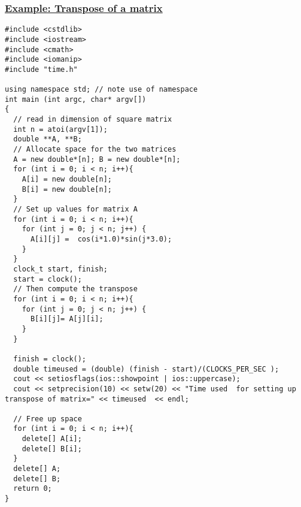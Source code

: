 \documentclass{beamer}
\begin{document}
\begin{frame}
\frametitle{\href{{https://github.com/CompPhysics/ComputationalPhysicsMSU/blob/master/doc/Programs/LecturePrograms/programs/Classes/cpp/program8.cpp}}{Example: Transpose of a matrix}}

\begin{Verbatim}[numbers=none,fontsize=\fontsize{9pt}{9pt},baselinestretch=0.95]
#include <cstdlib>
#include <iostream>
#include <cmath>
#include <iomanip>
#include "time.h"

using namespace std; // note use of namespace
int main (int argc, char* argv[])
{
  // read in dimension of square matrix
  int n = atoi(argv[1]);
  double **A, **B;
  // Allocate space for the two matrices
  A = new double*[n]; B = new double*[n];
  for (int i = 0; i < n; i++){
    A[i] = new double[n];
    B[i] = new double[n];
  }
  // Set up values for matrix A
  for (int i = 0; i < n; i++){
    for (int j = 0; j < n; j++) {
      A[i][j] =  cos(i*1.0)*sin(j*3.0);
    }
  }
  clock_t start, finish;
  start = clock();
  // Then compute the transpose
  for (int i = 0; i < n; i++){
    for (int j = 0; j < n; j++) {
      B[i][j]= A[j][i];
    }
  }

  finish = clock();
  double timeused = (double) (finish - start)/(CLOCKS_PER_SEC );
  cout << setiosflags(ios::showpoint | ios::uppercase);
  cout << setprecision(10) << setw(20) << "Time used  for setting up transpose of matrix=" << timeused  << endl;

  // Free up space
  for (int i = 0; i < n; i++){
    delete[] A[i];
    delete[] B[i];
  }
  delete[] A;
  delete[] B;
  return 0;
}

\end{Verbatim}
\end{frame}
\end{document}
